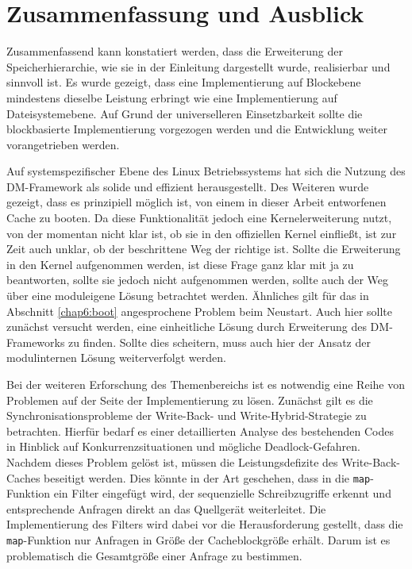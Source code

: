 \chapter{Zusammenfassung und Ausblick}
\label{chap8}

Zusammenfassend kann konstatiert werden, dass die Erweiterung der Speicherhierarchie, wie sie in der Einleitung dargestellt wurde, realisierbar und sinnvoll ist.
Es wurde gezeigt, dass eine Implementierung auf Blockebene mindestens dieselbe Leistung erbringt wie eine Implementierung auf Dateisystemebene. Auf Grund der
universelleren Einsetzbarkeit sollte die blockbasierte Implementierung vorgezogen werden und die Entwicklung weiter vorangetrieben werden.

Auf systemspezifischer Ebene des Linux Betriebssystems hat sich die Nutzung des \ac{DM}-Framework als solide und effizient herausgestellt. Des Weiteren wurde
gezeigt, dass es prinzipiell möglich ist, von einem in dieser Arbeit entworfenen Cache zu booten. Da diese Funktionalität jedoch eine Kernelerweiterung nutzt,
von der momentan nicht klar ist, ob sie in den offiziellen Kernel einfließt, ist zur Zeit auch unklar, ob der beschrittene Weg der richtige ist. Sollte die
Erweiterung in den Kernel aufgenommen werden, ist diese Frage ganz klar mit ja zu beantworten, sollte sie jedoch nicht aufgenommen werden, sollte auch der Weg
über eine moduleigene Lösung betrachtet werden. Ähnliches gilt für das in Abschnitt \ref{chap6:boot} angesprochene Problem beim Neustart. Auch hier sollte
zunächst versucht werden, eine einheitliche Lösung durch Erweiterung des \ac{DM}-Frameworks zu finden. Sollte dies scheitern, muss auch hier der Ansatz der
modulinternen Lösung weiterverfolgt werden.

Bei der weiteren Erforschung des Themenbereichs ist es notwendig eine Reihe von Problemen auf der Seite der Implementierung zu lösen. Zunächst gilt es
die Synchronisationsprobleme der Write-Back- und Write-Hybrid-Strategie zu betrachten. Hierfür bedarf es einer detaillierten Analyse des bestehenden Codes in
Hinblick auf Konkurrenzsituationen und mögliche Deadlock-Gefahren. Nachdem dieses Problem gelöst ist, müssen die Leistungsdefizite des Write-Back-Caches
beseitigt werden. Dies könnte in der Art geschehen, dass in die \texttt{map}-Funktion ein Filter eingefügt wird, der sequenzielle Schreibzugriffe erkennt und
entsprechende Anfragen direkt an das Quellgerät weiterleitet. Die Implementierung des Filters wird dabei vor die Herausforderung gestellt, dass die
\texttt{map}-Funktion nur Anfragen in Größe der Cacheblockgröße erhält. Darum ist es problematisch die Gesamtgröße einer Anfrage zu bestimmen.

